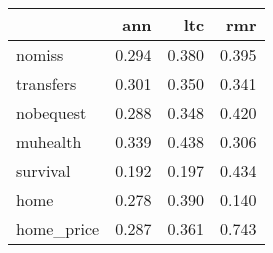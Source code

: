 \begin{tabular}{lrrr}
\toprule
{} &    ann &    ltc &    rmr \\
\midrule
nomiss     &  0.294 &  0.380 &  0.395 \\
transfers  &  0.301 &  0.350 &  0.341 \\
nobequest  &  0.288 &  0.348 &  0.420 \\
muhealth   &  0.339 &  0.438 &  0.306 \\
survival   &  0.192 &  0.197 &  0.434 \\
home       &  0.278 &  0.390 &  0.140 \\
home\_price &  0.287 &  0.361 &  0.743 \\
\bottomrule
\end{tabular}
